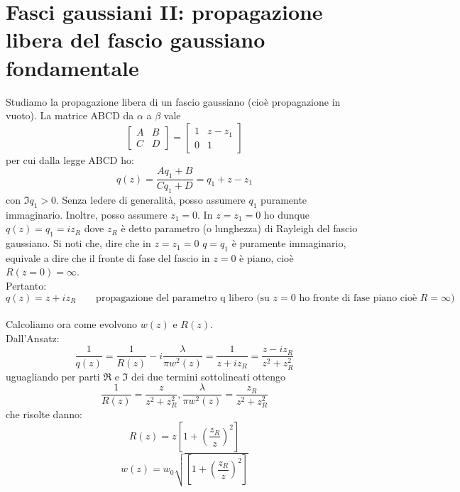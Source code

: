 \documentclass{book}
\def \l {\lambda}
\theoremstyle{remark}
\begin{document}
\section{Fasci gaussiani II: propagazione libera del fascio gaussiano fondamentale}
Studiamo la propagazione libera di un fascio gaussiano (cioè propagazione in vuoto).
La matrice ABCD da $\alpha$ a $\beta$ vale
\[
\begin{bmatrix}
A	&	B\\
C	&	D
\end{bmatrix} =
\begin{bmatrix}
1	&	z - z_1\\
0	&	1
\end{bmatrix}
\]
per cui dalla legge ABCD ho:
\begin{equation*}
q(z) = \frac{Aq_1 + B}{Cq_1 + D} = q_1 + z - z_1
\end{equation*}
con $\Im{q_1} > 0$. Senza ledere di generalità, posso assumere $q_1$ puramente immaginario. Inoltre, posso assumere $z_1 = 0$. In $z = z_1 = 0$ ho dunque $q(z) = q_1 = iz_R$ dove $z_R$ è detto parametro (o lunghezza) di Rayleigh del fascio gaussiano. Si noti che, dire che in $z = z_1 = 0$ $q = q_1$ è puramente immaginario, equivale a dire che il fronte di fase del fascio in $z = 0$ è piano, cioè $R(z=0) = \infty$.\\
Pertanto:
\begin{equation*}
q(z) = z + iz_R \qquad \text{propagazione del parametro q libero (su $z=0$ ho fronte di fase piano cioè $R=\infty$)}
\end{equation*}
\\
Calcoliamo ora come evolvono $w(z)$ e $R(z)$.\\
Dall'Ansatz:
\begin{equation*}
\frac{1}{q(z)} = \frac{1}{R(z)} -i\frac{\l}{\pi w^2(z)} = \frac{1}{z + iz_R} = \frac{z - iz_R}{z^2 + z_R^2}
\end{equation*}
uguagliando per parti $\Re$ e $\Im$ dei due termini sottolineati ottengo
\begin{equation*}
\frac{1}{R(z)} = \frac{z}{z^2 + z_R^2} , \frac{\l}{\pi w^2(z)} = \frac{z_R}{z^2 + z_R^2}
\end{equation*}
che risolte danno:
\begin{equation*}
R(z) = z \left[1 + \left(\frac{z_R}{z} \right)^2 \right]
\end{equation*}
\begin{equation*}
w(z) = w_0 \sqrt{\left[1 + \left(\frac{z_R}{z} \right)^2 \right]}
\end{equation*}
\end{document}
